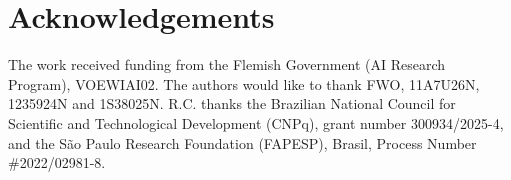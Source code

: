 \documentclass[letterpaper]{article}
\begin{document}

\fi

\section*{Acknowledgements}
The work received funding from the Flemish Government (AI Research Program), VOEWIAI02.
The authors would like to thank FWO, 11A7U26N, 1235924N and 1S38025N.
R.C. thanks the Brazilian National Council for Scientific and Technological Development (CNPq), grant number 300934/2025-4, and the São Paulo Research Foundation (FAPESP), Brasil, Process Number \#2022/02981-8.


\vfill

\iftrue

\fi
\end{document}

